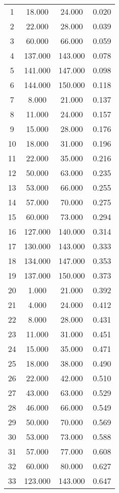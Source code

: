 % 
\begin{tabular}{cccc}
  \hline
  \hline
1 & 18.000 & 24.000 & 0.020 \\ 
  2 & 22.000 & 28.000 & 0.039 \\ 
  3 & 60.000 & 66.000 & 0.059 \\ 
  4 & 137.000 & 143.000 & 0.078 \\ 
  5 & 141.000 & 147.000 & 0.098 \\ 
  6 & 144.000 & 150.000 & 0.118 \\ 
  7 & 8.000 & 21.000 & 0.137 \\ 
  8 & 11.000 & 24.000 & 0.157 \\ 
  9 & 15.000 & 28.000 & 0.176 \\ 
  10 & 18.000 & 31.000 & 0.196 \\ 
  11 & 22.000 & 35.000 & 0.216 \\ 
  12 & 50.000 & 63.000 & 0.235 \\ 
  13 & 53.000 & 66.000 & 0.255 \\ 
  14 & 57.000 & 70.000 & 0.275 \\ 
  15 & 60.000 & 73.000 & 0.294 \\ 
  16 & 127.000 & 140.000 & 0.314 \\ 
  17 & 130.000 & 143.000 & 0.333 \\ 
  18 & 134.000 & 147.000 & 0.353 \\ 
  19 & 137.000 & 150.000 & 0.373 \\ 
  20 & 1.000 & 21.000 & 0.392 \\ 
  21 & 4.000 & 24.000 & 0.412 \\ 
  22 & 8.000 & 28.000 & 0.431 \\ 
  23 & 11.000 & 31.000 & 0.451 \\ 
  24 & 15.000 & 35.000 & 0.471 \\ 
  25 & 18.000 & 38.000 & 0.490 \\ 
  26 & 22.000 & 42.000 & 0.510 \\ 
  27 & 43.000 & 63.000 & 0.529 \\ 
  28 & 46.000 & 66.000 & 0.549 \\ 
  29 & 50.000 & 70.000 & 0.569 \\ 
  30 & 53.000 & 73.000 & 0.588 \\ 
  31 & 57.000 & 77.000 & 0.608 \\ 
  32 & 60.000 & 80.000 & 0.627 \\ 
  33 & 123.000 & 143.000 & 0.647 \\ 

\end{tabular}
